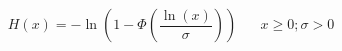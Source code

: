 \documentclass[12pt]{article}
\begin{document}
\pagestyle{empty}
\large
{}
\pagecolor{ehandbook}

\[
H(x) = -\ln(1 - \Phi(\frac{\ln(x)} {\sigma})) \hspace{20pt}  x \ge 0; \sigma > 0
\]
\end{document}
